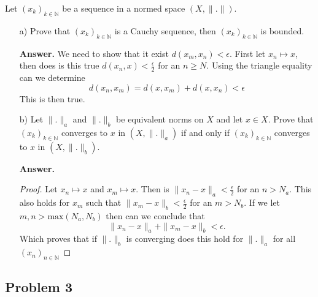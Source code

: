 \documentclass{article}
\theoremstyle{remark}
\begin{document}
Let $\left( x_{k} \right)_{k \in \mathbb{N}} $ be a sequence in a normed space $\left( X, \|.\| \right) $. 

\begin{enumerate}
  \item[a)] Prove that $\left( x_{k} \right)_{k \in \mathbb{N}}$ is a Cauchy sequence, then $\left( x_{k} \right)_{k \in \mathbb{N}}$ is bounded. 
      \par
      \begin{tcolorbox}
        \textbf{Answer.} 
        We need to show that it exist $d\left( x_{m}, x_{n} \right)< \epsilon$.
        First let $x_{n} \mapsto x $, then does is this true $d\left( x_{n}, x \right) < \frac{\epsilon}{2}$ for an $n \ge N$. Using the triangle equality can we determine \[
        d\left( x_{n}, x_{m} \right) = d\left( x,x_{m} \right) + d\left( x, x_{n} \right) < \epsilon
        \] 
        This is then true. 
      \end{tcolorbox}
  \item[b)]  Let $\|.\|_{a}$ and $\|.\|_{b}$ be equivalent norms on $X$ and let $x \in X$. Prove that  $\left( x_{k} \right)_{k \in \mathbb{N}}$ converges to $x$ in $\left( X, \|.\|_a \right)$ if and only if $\left( x_{k} \right)_{ k \in \mathbb{N}}$ converges to $x$ in $\left( X, \|.\|_{b} \right)$.
      \begin{tcolorbox}
        \textbf{Answer.} 
        
        \begin{proof}
          Let $x_{n} \mapsto x$ and $x_{m} \mapsto x$. Then is $\|x_{n} - x\|_{a} < \frac{\epsilon}{2}$ for an $n > N_{a}$.  This also holds for $x_{m}$ such that $\|x_{m} - x\|_{b} < \frac{\epsilon}{2}$ for an $m > N_{b}$. If we let $m,n > \text{max}\left( N_{a}, N_{b} \right)$ then can we conclude that \[
          \|x_{n} - x\|_{a} + \|x_{m} - x\|_{b} < \epsilon
          .\] 
          Which proves that if $\|.\|_b$ is converging does this hold for $\|.\|_a$ for all $\left( x_n \right)_{n \in \mathbb{N}}$ 
        \end{proof}

      \end{tcolorbox}


\end{enumerate}


\subsection{Problem 3}%
\label{sub:problem_3}
\end{document}
